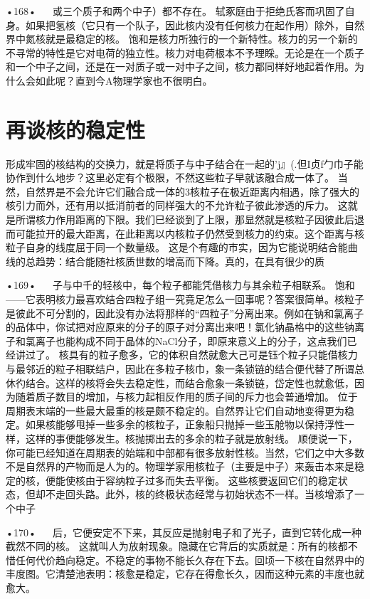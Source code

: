 •168•
  
或三个质子和两个中子）都不存在。
轼豖庭由于拒绝氏客而巩固了自身。如果把氢核（它只有一个队子，因此核内没有任何核力在起作用）除外，自然界中氮核就是最稳定的核。
饱和是核力所独行的一个新特性。核力的另一个新的不寻常的特性是它对电荷的独立性。核力对电荷根本不予理睬。无论是在一个质子和一个中子之间，还是在一对质子或一对中子之间，核力都同样好地起着作用。为什么会如此呢？直到今A物理学家也不很明白。

\section{再谈核的稳定性}

形成牢固的核结构的交换力，就是将质子与中子结合在一起的'j』(.但I贞f勹巾子能协作到什么地步？这里必定有个极限，不然这些粒子早就该融合成一体了。
当然，自然界是不会允许它们融合成一体的3核粒子在极近距离内相遇，除了强大的核引力而外，还有用以抵消前者的同样强大的不允许粒子彼此渗透的斥力。
这就是所谓核力作用距离的下限。我们巳经谈到了上限，那显然就是核粒子因彼此后退而可能拉开的最大距离，在此耟离以内核粒子仍然受到核力的约束。这个距离与核粒子自身的线度屈于同一个数量级。
这是个有趣的市实，因为它能说明结合能曲线的总趋势：结合能随社核质世数的增高而下降。真的，在具有很少的质

•169•
  
子与中千的轻核中，每个粒子都能凭借核力与其余粒子相联系。
饱和——它表明核力最喜欢结合四粒子组一究竟足怎么一回事呢？答案很简单。核粒子是彼此不可分割的，因此没有办法将那样的“四粒子”分离出来。例如在钠和氯离子的品体中，你试把对应原来的分子的原子对分离出来吧！氯化钠晶格中的这些钠离子和氯离子也能构成不同于晶体的NaCl分子，即原来意义上的分子，这点我们已经讲过了。
核具有的粒子愈多，它的体积自然就愈大己可是钰个粒子只能借核力与最邻近的粒子相联结户，因此在多粒子核巾，象一条锁链的结合便代替了所谓总休彴结合。这样的核将会失去稳定性，而结合愈象一条锁链，岱定性也就愈低，因为随着质子数目的增加，与核力起相反作用的质子间的斥力也会普通增加。
位于周期表末端的一些最大最重的核是颇不稳定的。自然界让它们自动地变得更为稳定。如果核能够甩掉一些多余的核粒子，正象船只抛掉一些玉舱物以保持浮性一样，这样的事便能够发生。核抛掷出去的多余的粒子就是放射线。
顺便说一下，你可能已经知道在周期表的始端和中部都有很多放射性核。当然，它们之中大多数不是自然界的产物而是人为的。物理学家用核粒子（主要是中子）来轰击本来是稳定的核，便能使核由于容纳粒子过多而失去平衡。
这些核要返回它们的稳定状态，但却不走回头路。此外，核的终极状态经常与初始状态不一样。当核增添了一个中子

•170•
  
后，它便安定不下来，其反应是抛射电子和了光子，直到它转化成一种截然不同的核。
这就叫人为放射现象。隐藏在它背后的实质就是：所有的核都不惜任何代价趋向稳定。不稳定的事物不能长久存在下去。回顷一下核在自然界中的丰度图。它清楚池表明：核愈是稳定，它存在得愈长久，因而这种元素的丰度也就愈大。

